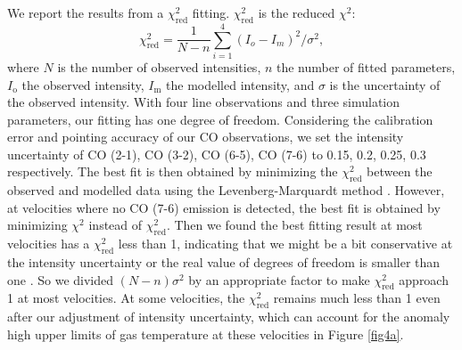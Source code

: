 We report the results from a $\chi^2_{\mathrm{red}}$ fitting. $\chi^2_{\mathrm{red}}$ is the reduced $\chi^2$: 
\begin{equation}
\chi^2_{\mathrm{red}} = \frac{1}{N - n} \sum_{i=1}^{4}(I_o - I_m)^2/\sigma^2,
\end{equation}
where $N$ is the number of observed intensities, $n$ the number of fitted parameters, $I_\mathrm{o}$ the observed intensity, $I_\mathrm{m}$ the modelled intensity, and $\sigma$ is the uncertainty of the observed intensity. With four line observations and three simulation parameters, our fitting has one degree of freedom. Considering the calibration error and pointing accuracy of our CO observations, we set the intensity uncertainty of CO (2-1), CO (3-2), CO (6-5), CO (7-6) to 0.15, 0.2, 0.25, 0.3 respectively. The best fit is then obtained by minimizing the $\chi^2_{\mathrm{red}}$ between the observed and modelled data using the Levenberg-Marquardt method \citep{1992nrfa.book.....P}. However, at velocities where no CO (7-6) emission is detected, the best fit is obtained by minimizing $\chi^2$ instead of $\chi^2_{\mathrm{red}}$. Then we found the best fitting result at most velocities has a $\chi^2_{\mathrm{red}}$ less than 1, indicating that we might be a bit conservative at the intensity uncertainty or the real value of degrees of freedom is smaller than one \citep{2010arXiv1012.3754A}. So we divided $(N - n)\sigma^2$ by an appropriate factor to make $\chi^2_{\mathrm{red}}$ approach 1 at most velocities. At some velocities, the $\chi_{\mathrm{red}}^2$ remains much less than 1 even after our adjustment of intensity uncertainty, which can account for the anomaly high upper limits of gas temperature at these velocities in Figure \ref{fig4a}. 

